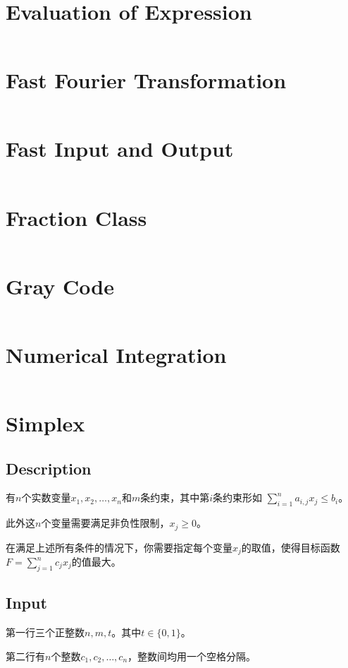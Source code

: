 \documentclass[a4paper,openany]{book}
\newcommand{\cppcode}[1]
{
  \inputminted[mathescape,
  tabsize=4,
  linenos,
  framesep=2mm,
  breakaftergroup=true,
  breakautoindent=true,
  breakbytoken=true,
  breaklines=true,
  fontsize=\small
  ]{cpp}{source/#1}
}
\begin{document}
\section{Evaluation of Expression}
\cppcode{/Numerical Algorithms/Evaluation of Expression.cpp}
\section{Fast Fourier Transformation}
\cppcode{/Numerical Algorithms/Fast Fourier Transformation.cpp}
\section{Fast Input and Output}
\cppcode{/Numerical Algorithms/Fast Input and Output.cpp}
\section{Fraction Class}
\cppcode{/Numerical Algorithms/Fraction Class.cpp}
\section{Gray Code}
\cppcode{/Numerical Algorithms/Gray Code.cpp}
\section{Numerical Integration}
\cppcode{/Numerical Algorithms/Numerical Integration.cpp}
\section{Simplex}
\subsection{Description}
有$n$个实数变量$x_1,x_2,\ldots,x_n$和$m$条约束，其中第$i$条约束形如 $\sum_{i = 1}^{n}a_{i,j}x_j \leq b_i$。

此外这$n$个变量需要满足非负性限制，$x_j \geq 0$。

在满足上述所有条件的情况下，你需要指定每个变量$x_j$的取值，使得目标函数$F = \sum_{j = 1}^{n}c_jx_j$的值最大。

\subsection{Input}
第一行三个正整数$n,m,t$。其中$t \in \{ 0,1 \}$。

第二行有$n$个整数$c_1,c_2,\ldots,c_n$，整数间均用一个空格分隔。
\end{document}
